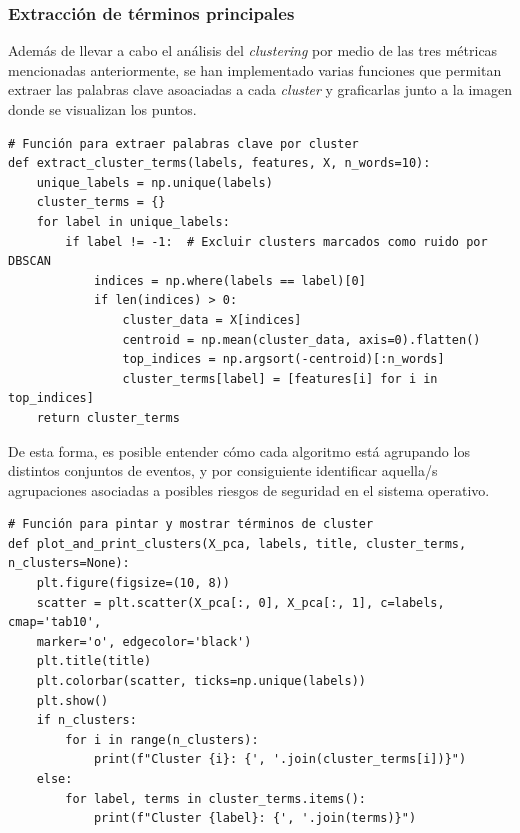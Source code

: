 \subsubsection*{Extracción de términos principales}

Además de llevar a cabo el análisis del \textit{clustering} por medio de las tres métricas mencionadas anteriormente, se han implementado varias funciones que permitan extraer las palabras clave asoaciadas a cada \textit{cluster} y graficarlas junto a la imagen donde se visualizan los puntos. 

\begin{center}
    \begin{mdframed}
    \scriptsize
            \begin{verbatim}
# Función para extraer palabras clave por cluster
def extract_cluster_terms(labels, features, X, n_words=10):
    unique_labels = np.unique(labels)
    cluster_terms = {}
    for label in unique_labels:
        if label != -1:  # Excluir clusters marcados como ruido por DBSCAN
            indices = np.where(labels == label)[0]
            if len(indices) > 0:
                cluster_data = X[indices]
                centroid = np.mean(cluster_data, axis=0).flatten()
                top_indices = np.argsort(-centroid)[:n_words]
                cluster_terms[label] = [features[i] for i in top_indices]
    return cluster_terms
            \end{verbatim}
    \end{mdframed}
\end{center}

De esta forma, es posible entender cómo cada algoritmo está agrupando los distintos conjuntos de eventos, y por consiguiente identificar aquella/s agrupaciones asociadas a posibles riesgos de seguridad en el sistema operativo. 

\begin{center}
    \begin{mdframed}
    \scriptsize
            \begin{verbatim}
# Función para pintar y mostrar términos de cluster
def plot_and_print_clusters(X_pca, labels, title, cluster_terms, n_clusters=None):
    plt.figure(figsize=(10, 8))
    scatter = plt.scatter(X_pca[:, 0], X_pca[:, 1], c=labels, cmap='tab10', 
    marker='o', edgecolor='black')
    plt.title(title)
    plt.colorbar(scatter, ticks=np.unique(labels))
    plt.show()
    if n_clusters:
        for i in range(n_clusters):
            print(f"Cluster {i}: {', '.join(cluster_terms[i])}")
    else:
        for label, terms in cluster_terms.items():
            print(f"Cluster {label}: {', '.join(terms)}")
            \end{verbatim}
    \end{mdframed}
\end{center}
